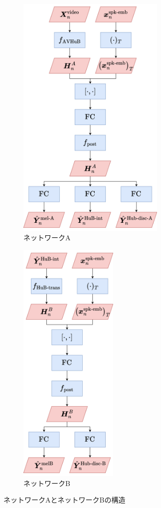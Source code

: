 \begin{figure}[tb]
    \centering
    \begin{subfigure}[b]{0.48\textwidth}
        \centering
        \includegraphics[height=120mm]{./figure/sec4/model_2/networkA.drawio.png}
        \caption{ネットワークA}
        \label{sec4:fig:networkA}
    \end{subfigure}
    \hfill
    \begin{subfigure}[b]{0.48\textwidth}
        \centering
        \includegraphics[height=120mm]{./figure/sec4/model_2/networkB.drawio.png}
        \caption{ネットワークB}
        \label{sec4:fig:networkB}
    \end{subfigure}
    \hfill
    \caption{ネットワークAとネットワークBの構造}
    \label{sec4:fig:networkAB}
\end{figure}

